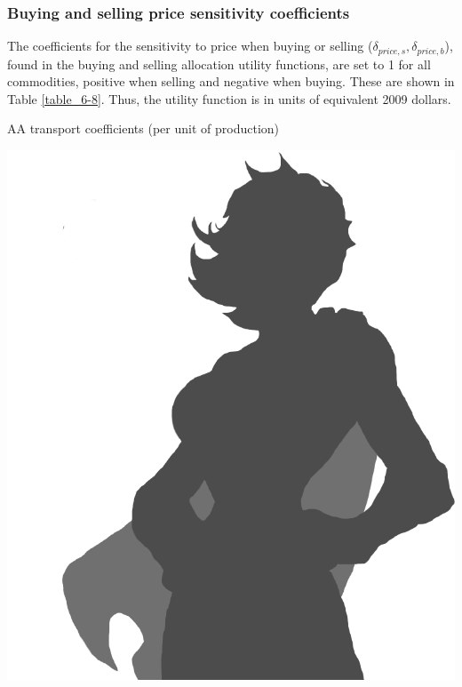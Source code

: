\subsubsection{Buying and selling price sensitivity coefficients}

The coefficients for the sensitivity to price when buying or selling ($\delta_{price,s}, \delta_{price,b}$), found in the buying and selling allocation utility functions, are set to 1 for all commodities, positive when selling and negative when buying. These are shown in Table \ref{table_6-8}. Thus, the utility function is in units of equivalent 2009 dollars.

\begin{table}   %
\centering
\caption{AA transport coefficients (per unit of production)}
\label{tab:aa-transport-coefficients}
\includegraphics[scale=0.5]{graphics/placeholder-female-superhero-c}
\end{table}
